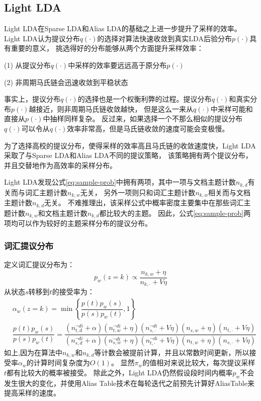\subsection{Light LDA}
Light LDA在Sparse LDA和Alias LDA的基础之上进一步提升了采样的效率。
Light LDA认为提议分布$q(\cdot)$的选择对算法快速收敛到真实LDA后验分布$p(\cdot)$具有重要的意义，
挑选得好的分布能够从两个方面提升采样效率：

(1) 从提议分布$q(\cdot)$中采样的效率要远远高于原分布$p(\cdot)$

(2) 非周期马氏链会迅速收敛到平稳状态

事实上，提议分布$q(\cdot)$的选择也是一个权衡利弊的过程。提议分布$q(\cdot)$和真实分布$p(\cdot)$越接近，则非周期马氏链收敛越快，
但是这么一来从$q(\cdot)$中采样可能和直接从$p(\cdot)$中抽样同样复杂。
反过来，如果选择一个不那么相似的提议分布$q(\cdot)$可以令从$q(\cdot)$效率非常高，但是马氏链收敛的速度可能会变极慢。

为了选择高校的提议分布，使得采样的效率高且马氏链的收敛速度快，Light LDA采取了与Sparse LDA和Alias LDA不同的提议策略，
该策略拥有两个提议分布，并且交替地作为高效率的采样分布。

Light LDA发现公式\ref{eq:sample-prob}中拥有两项，其中一项与文档主题计数$n_{k,d}$有关而与词汇主题计数$n_{k,w}$无关，
另外一项则只和词汇主题计数$n_{k,w}$相关而与文档主题计数$n_{k,d}$无关。
不难推理出，该采样公式中概率密度主要集中在那些词汇主题计数$n_{k,w}$和文档主题计数$n_{k,d}$都比较大的主题。
因此，公式\ref{eq:sample-prob}两项均可以作为较好的主题采样分布的提议分布。

\subsubsection{词汇提议分布}
定义词汇提议分布为：
\begin{equation}
p_w(z = k) \propto \dfrac{n_{k,w} +\eta}{n_{k, \cdot} + V \eta}
\end{equation}
从状态$s$转移到$t$的接受率为：
\begin{equation}
\begin{aligned}
& \alpha_w(z=k) = \min \left\{\dfrac{p(t) p_w(s)}{p(s)p_w(t)}, 1\right\} \\
& \dfrac{p(t) p_w(s)}{p(s)p_w(t)}= \dfrac{ (n_{t,d}^{\neg di} + \alpha)(n_{t,w}^{\neg di} + \eta) (n_{s,\cdot}^{\neg di} + V \eta) (n_{s,w} + \eta) ( n_{t, \cdot} + V \eta)}
{ (n_{s,d}^{\neg di} + \alpha)(n_{s,w}^{\neg di} + \eta) (n_{t,\cdot}^{\neg di} + V \eta) (n_{t,w} + \eta) ( n_{s, \cdot} + V \eta)}
\end{aligned}
\end{equation}
如上,因为在算法中$n_{k, w}$和$n_{k, d}$等计数会被提前计算，并且以常数时间更新，所以接受率$\alpha_w$的计算时间复杂度为$O(1)$。
显然$\pi_w$的值相对来说比较大，每次提议采样$t$都有比较大的概率被接受。
除此之外，Light LDA仍然假设段时间内概率$p_w$不会发生很大的变化，并使用Alias Table技术在每轮迭代之前预先计算好AliasTable来提高采样的速度。


